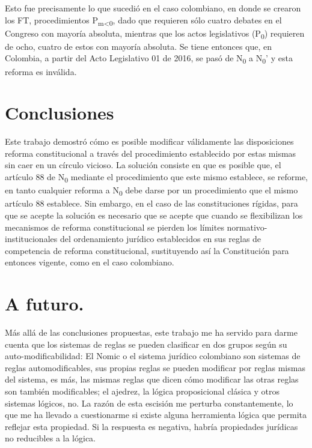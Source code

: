 \documentclass[]{book}
\begin{document}
\begin{refsection}
Esto fue precisamente lo que sucedió en el caso colombiano, en donde se
crearon los FT, procedimientos P\textsubscript{m\textless{}0}, dado que
requieren sólo cuatro debates en el Congreso con mayoría absoluta,
mientras que los actos legislativos (P\textsubscript{0}) requieren de
ocho, cuatro de estos con mayoría absoluta. Se tiene entonces que, en
Colombia, a partir del Acto Legislativo 01 de 2016, se pasó de N\textsubscript{0} a
N\textsubscript{0}' y esta reforma es inválida.

\section*{Conclusiones}

Este trabajo demostró cómo es posible modificar válidamente las
disposiciones reforma constitucional a través del procedimiento
establecido por estas mismas sin caer en un círculo vicioso. La solución
consiste en que es posible que, el artículo 88 de N\textsubscript{0}
mediante el procedimiento que este mismo establece, se reforme, en tanto
cualquier reforma a N\textsubscript{0} debe darse por un procedimiento
que el mismo artículo 88 establece. Sin embargo, en el caso de las
constituciones rígidas, para que se acepte la solución es necesario que
se acepte que cuando se flexibilizan los mecanismos de reforma
constitucional se pierden los límites normativo-institucionales del
ordenamiento jurídico establecidos en sus reglas de competencia de
reforma constitucional, sustituyendo así la Constitución para entonces
vigente, como en el caso colombiano.

\section*{A futuro.}

Más allá de las conclusiones propuestas, este trabajo me ha servido para
darme cuenta que los sistemas de reglas se pueden clasificar en dos grupos
según su auto-modificabilidad: El Nomic o el sistema jurídico colombiano
son sistemas de reglas automodificables, sus propias reglas se pueden
modificar por reglas mismas del sistema, es más, las mismas reglas que
dicen cómo modificar las otras reglas son también modificables; el
ajedrez, la lógica proposicional clásica y otros sistemas lógicos, no.
La razón de esta escisión me perturba constantemente, lo que me ha
llevado a cuestionarme si existe alguna herramienta lógica que permita
reflejar esta propiedad. Si la respuesta es negativa, habría propiedades
jurídicas no reducibles a la lógica.


\end{refsection}
\end{document}
